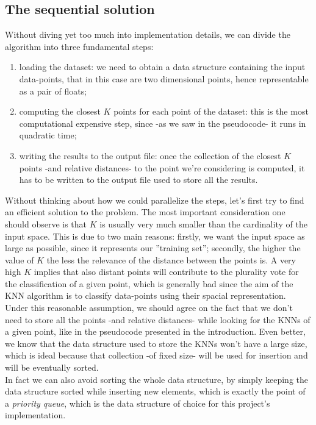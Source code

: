 \documentclass[12pt, letterpaper]{article}  %
\begin{document}
\subsection{The sequential solution}
Without diving yet too much into implementation details, we can divide the algorithm into three fundamental steps: 
\begin{enumerate}
    \item loading the dataset: we need to obtain a data structure containing the input data-points, that in this case are two dimensional points, hence representable as a pair of floats;
    \item computing the closest $K$ points for each point of the dataset: this is the most computational expensive step, since -as we saw in the pseudocode- it runs in quadratic time;
    \item writing the results to the output file: once the collection of the closest $K$ points -and relative distances- to the point we're considering is computed, it has to be written to the output file used to store all the results.
\end{enumerate}
Without thinking about how we could parallelize the steps, let's first try to find an efficient solution to the problem.
The most important consideration one should observe is that $K$ is usually very much smaller than the cardinality of the input space. This is due to two main reasons: firstly, we want the input space as large as possible, since it represents our ''training set''; secondly, the higher the value of $K$ the less the relevance of the distance between the points is. A very high $K$ implies that also distant points will contribute to the plurality vote for the classification of a given point, which is generally bad since the aim of the KNN algorithm is to classify data-points using their spacial representation.\\
Under this reasonable assumption, we should agree on the fact that we don't need to store all the points -and relative distances- while looking for the KNNs of a given point, like in the pseudocode presented in the introduction. Even better, we know that the data structure used to store the KNNs won't have a large size, which is ideal because that collection -of fixed size- will be used for insertion and will be eventually sorted.\\
In fact we can also avoid sorting the whole data structure, by simply keeping the data structure sorted while inserting new elements, which is exactly the point of a \textit{priority queue}, which is the data structure of choice for this project's implementation. 
\end{document}
